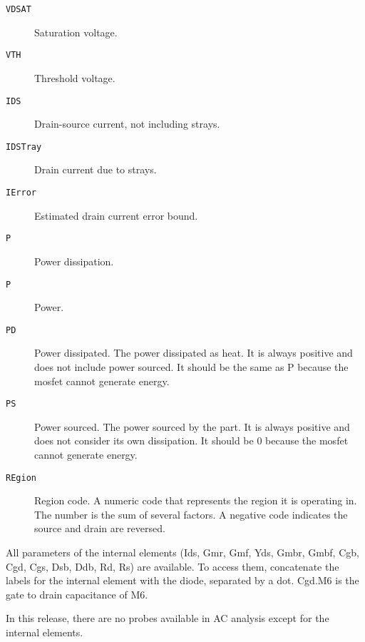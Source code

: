 \begin{description}
\item[{\tt VDSAT}] Saturation voltage.

\item[{\tt VTH}] Threshold voltage.

\item[{\tt IDS}] Drain-source current, not including strays.

\item[{\tt IDSTray}] Drain current due to strays.

\item[{\tt IError}] Estimated drain current error bound.

\item[{\tt P}] Power dissipation.

\item[{\tt P}] Power.

\item[{\tt PD}] Power dissipated.  The power dissipated as heat.  
It is always positive and does not include power sourced.
It should be the same as P because the mosfet cannot generate energy.

\item[{\tt PS}] Power sourced.  The power sourced by the part.  
It is always positive and does not consider its own dissipation.
It should be 0 because the mosfet cannot generate energy.

\item[{\tt REgion}] Region code.  A numeric code that represents the region
it is operating in.  The number is the sum of several factors.  A negative
code indicates the source and drain are reversed.


\end{description}

All parameters of the internal elements (Ids, Gmr, Gmf, Yds, Gmbr, Gmbf,
Cgb, Cgd, Cgs, Dsb, Ddb, Rd, Rs) are available.  To access them, concatenate
the labels for the internal element with the diode, separated by a dot.
Cgd.M6 is the gate to drain capacitance of M6.

In this release, there are no probes available in AC analysis except for the
internal elements.
